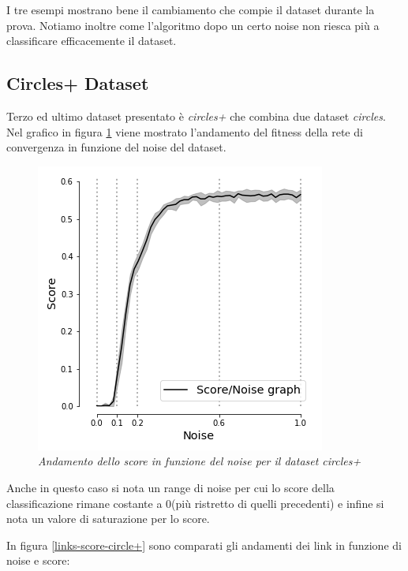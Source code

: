 \documentclass[12pt,a4paper]{report}
\begin{document}
I tre esempi mostrano bene il cambiamento che compie il dataset durante la prova.
Notiamo inoltre come l'algoritmo dopo un certo noise non riesca più a classificare efficacemente il dataset.

\subsection{Circles+ Dataset}

Terzo ed ultimo dataset presentato è \textit{circles+} che combina due dataset \textit{circles}.
Nel grafico in figura \ref{score-circles+} viene mostrato l'andamento del fitness della rete di convergenza in funzione del noise del dataset.

\begin{figure}[H]
 \centering
 \includegraphics[scale = 0.5]{images/score_noise_circles+}
 \caption{\textit{Andamento dello score in funzione del noise per il dataset circles+}}
 \label{score-circles+}
\end{figure}

Anche in questo caso si nota un range di noise per cui lo score della classificazione rimane costante a 0(più ristretto di quelli precedenti) e infine si nota un valore di saturazione per lo score.

In figura \ref{links-score-circle+} sono comparati gli andamenti dei link in funzione di noise e score:
\end{document}
